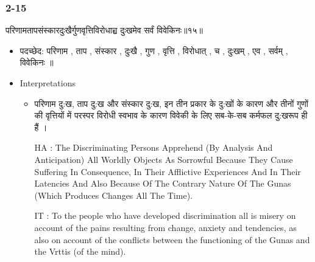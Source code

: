 \begin{frame}[fragile]\frametitle{2-15}
\begin{sanskrit}
परिणामतापसंस्कारदुःखैर्गुणवृत्तिविरोधाच्च दुःखमेव सर्वं विवेकिनः॥१५॥
\end{sanskrit}

	\begin{itemize}
	\item पदच्छेद: परिणाम , ताप , संस्कार , दुःखै , गुण , वृत्ति , विरोधात् , च , दुःखम् , एव , सर्वम् , विवेकिनः ॥
	\item Interpretations
		\begin{itemize}
		\item परिणाम दु:ख, ताप दु:ख और संस्कार दु:ख, इन तीन प्रकार के दु:खों के कारण और तीनों गुणों की वृत्तियों में परस्पर विरोधी स्वभाव के कारण विवेकी के लिए सब-के-सब कर्मफल दु:खरूप ही हैं ।
		\item [HA]: The Discriminating Persons Apprehend (By Analysis And Anticipation) All Worldly Objects As Sorrowful Because They Cause Suffering In Consequence, In Their Afflictive Experiences And In Their Latencies And Also Because Of The Contrary Nature Of The Gunas (Which Produces Changes All The Time).
		\item [IT]: To the people who have developed discrimination all is misery on account of the pains resulting from change, anxiety and tendencies, as also on account of the conflicts between the functioning of the Gunas and the Vrttis (of the mind).
		\end{itemize}
	\end{itemize}
	
\end{frame}

